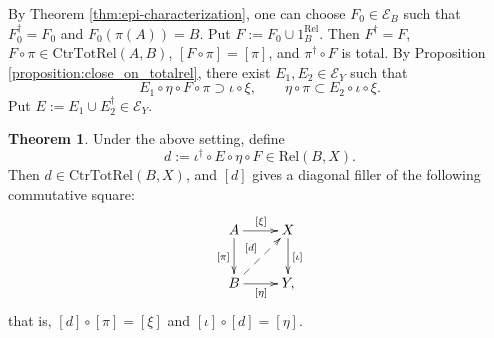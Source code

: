 \documentclass[12pt, a4paper]{amsart}
\theoremstyle{definition}
\newtheorem{theorem}{Theorem}[section]
\newcommand{\Rel}{\mathrm{Rel}}
\newcommand{\CtrTotRel}{\mathrm{CtrTotRel}}
\begin{document}
By Theorem \ref{thm:epi-characterization}, one can choose
$F_0\in\mathcal{E}_B$ such that $F_0^\dagger = F_0$ and 
$F_0(\pi(A))=B$.
Put $F:=F_0\cup 1_B^{\Rel}$. 
Then $F^\dagger = F$, 
$F\circ\pi\in\CtrTotRel(A,B)$,
$[F\circ\pi]=[\pi]$,
and
$\pi^\dagger\circ F$ is total.
By Proposition \ref{proposition:close_on_totalrel}, there exist
$E_1,E_2\in\mathcal{E}_Y$ such that
\[
E_1\circ\eta\circ F\circ\pi \supset \iota\circ\xi,
\qquad
\eta\circ\pi \subset E_2\circ\iota\circ\xi.
\]
Put $E:= E_1 \cup E_2^\dagger \in\mathcal{E}_Y$.

\begin{theorem}\label{theorem:explicit_lift_epi_mono}
Under the above setting, define
\[
d:=\iota^\dagger\circ E \circ\eta\circ F \in \Rel(B,X).
\]
Then $d\in\CtrTotRel(B,X)$, and $[d]$ gives a diagonal filler of the
following commutative square:
\[
\xymatrix{
A
\ar[r]^{[\xi]}
\ar[d]_{[\pi]}
&
X
\ar[d]^{[\iota]}
\\
B
\ar[r]_{[\eta]}
\ar@{-->}[ur]^{[d]}
&
Y,
}
\]
that is,
$[d]\circ[\pi]=[\xi]$ and $[\iota]\circ[d]=[\eta]$.
\end{theorem}
\end{document}

